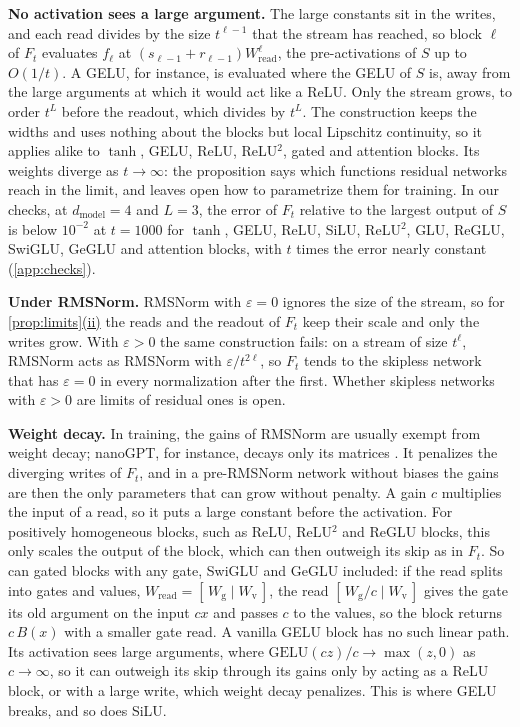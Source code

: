 \documentclass[10pt]{article}
\theoremstyle{definition}
\theoremstyle{remark}
\newcommand{\Wread}{W_{\mathrm{read}}}
\newcommand{\dm}{d_{\mathrm{model}}}
\newcommand{\para}[1]{\smallskip\noindent\textbf{#1}\hspace{0.5em}}
\DeclareRobustCommand{\cpref}[2]{\hyperref[#1:#2]{\cref*{#1}(#2)}}
\begin{document}
\para{No activation sees a large argument.} The large constants sit in the writes, and each read divides by the size $t^{\ell-1}$ that the stream has reached, so block $\ell$ of $F_t$ evaluates $f_\ell$ at $(s_{\ell-1} + r_{\ell-1})\Wread^{\ell}$, the pre-activations of $S$ up to $O(1/t)$. A GELU, for instance, is evaluated where the GELU of $S$ is, away from the large arguments at which it would act like a ReLU. Only the stream grows, to order $t^L$ before the readout, which divides by $t^L$. The construction keeps the widths and uses nothing about the blocks but local Lipschitz continuity, so it applies alike to $\tanh$, GELU, ReLU, ReLU$^2$, gated and attention blocks. Its weights diverge as $t \to \infty$: the proposition says which functions residual networks reach in the limit, and leaves open how to parametrize them for training. In our checks, at $\dm = 4$ and $L = 3$, the error of $F_t$ relative to the largest output of $S$ is below $10^{-2}$ at $t = 1000$ for $\tanh$, GELU, ReLU, SiLU, ReLU$^2$, GLU, ReGLU, SwiGLU, GeGLU and attention blocks, with $t$ times the error nearly constant (\cref{app:checks}).

\para{Under RMSNorm.} RMSNorm with $\varepsilon = 0$ ignores the size of the stream, so for \cpref{prop:limits}{ii} the reads and the readout of $F_t$ keep their scale and only the writes grow. With $\varepsilon > 0$ the same construction fails: on a stream of size $t^{\ell}$, RMSNorm acts as RMSNorm with $\varepsilon/t^{2\ell}$, so $F_t$ tends to the skipless network that has $\varepsilon = 0$ in every normalization after the first. Whether skipless networks with $\varepsilon > 0$ are limits of residual ones is open.

\para{Weight decay.} In training, the gains of RMSNorm are usually exempt from weight decay; nanoGPT, for instance, decays only its matrices \citep{karpathy2023nanogpt}. It penalizes the diverging writes of $F_t$, and in a pre-RMSNorm network without biases the gains are then the only parameters that can grow without penalty. A gain $c$ multiplies the input of a read, so it puts a large constant before the activation. For positively homogeneous blocks, such as ReLU, ReLU$^2$ and ReGLU blocks, this only scales the output of the block, which can then outweigh its skip as in $F_t$. So can gated blocks with any gate, SwiGLU and GeGLU included: if the read splits into gates and values, $\Wread = [\,W_{\mathrm g} \mid W_{\mathrm v}\,]$, the read $[\,W_{\mathrm g}/c \mid W_{\mathrm v}\,]$ gives the gate its old argument on the input $cx$ and passes $c$ to the values, so the block returns $c\,B(x)$ with a smaller gate read. A vanilla GELU block has no such linear path. Its activation sees large arguments, where $\mathrm{GELU}(cz)/c \to \max(z, 0)$ as $c \to \infty$, so it can outweigh its skip through its gains only by acting as a ReLU block, or with a large write, which weight decay penalizes. This is where GELU breaks, and so does SiLU.
\end{document}
